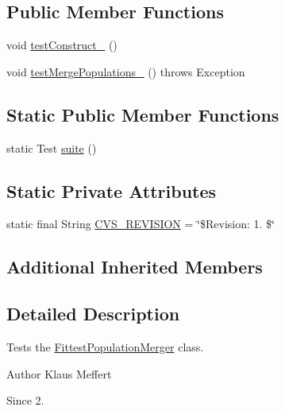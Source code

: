 \subsection*{Public Member Functions}
\begin{DoxyCompactItemize}
\item 
void \hyperlink{classorg_1_1jgap_1_1impl_1_1_fittest_population_merger_test_aebee945462705239c749b15ff1f3db1c}{test\-Construct\-\_} ()
\item 
void \hyperlink{classorg_1_1jgap_1_1impl_1_1_fittest_population_merger_test_adda6de942fdd1f02b8e6ce9937c0de40}{test\-Merge\-Populations\-\_} ()  throws Exception 
\end{DoxyCompactItemize}
\subsection*{Static Public Member Functions}
\begin{DoxyCompactItemize}
\item 
static Test \hyperlink{classorg_1_1jgap_1_1impl_1_1_fittest_population_merger_test_af0bb9df9e733b6bd36f9d343ff303e69}{suite} ()
\end{DoxyCompactItemize}
\subsection*{Static Private Attributes}
\begin{DoxyCompactItemize}
\item 
static final String \hyperlink{classorg_1_1jgap_1_1impl_1_1_fittest_population_merger_test_a3a6a213902b90a3f97de33dafba46be8}{C\-V\-S\-\_\-\-R\-E\-V\-I\-S\-I\-O\-N} = \char`\"{}\$Revision\-: 1. \$\char`\"{}
\end{DoxyCompactItemize}
\subsection*{Additional Inherited Members}


\subsection{Detailed Description}
Tests the \hyperlink{classorg_1_1jgap_1_1impl_1_1_fittest_population_merger}{Fittest\-Population\-Merger} class.

\begin{DoxyAuthor}{Author}
Klaus Meffert 
\end{DoxyAuthor}
\begin{DoxySince}{Since}
2. 
\end{DoxySince}


